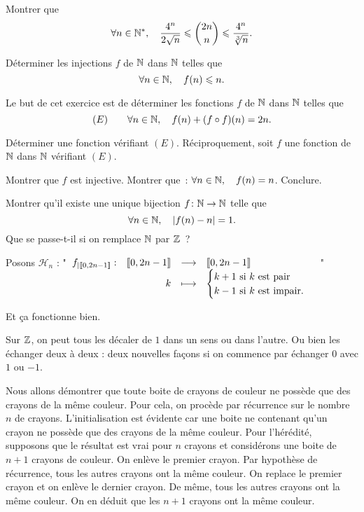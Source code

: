 \documentclass{magnolia}
\begin{document}
Montrer que
\[\forall n\in{\mathbb{N}^*},\quad \frac{4^n}{2\sqrt{n}}\leqslant\binom{2n}{n}\leqslant\frac{4^n}{\sqrt[3]{n}}.\]


Déterminer les injections $f$ de $\mathbb{N}$ dans $\mathbb{N}$ telles que
\[\forall n\in\mathbb{N},\quad f(n)\leqslant n.\]

Le but de cet exercice est de déterminer les fonctions $f$ de $\mathbb{N}$ dans $\mathbb{N}$ telles que
\[(E) \qquad \forall n\in\mathbb{N},\quad f(n)+(f\circ f)(n)=2n.\]
\begin{questions}
\question Déterminer une fonction vérifiant $(E)$.
\question Réciproquement, soit $f$ une fonction de $\mathbb{N}$ dans $\mathbb{N}$ vérifiant $(E)$.
\begin{questions}
\question Montrer que $f$ est injective.
\question Montrer que~: $\forall n\in\mathbb{N},\quad f(n)=n$. Conclure.
\end{questions}
\end{questions}


Montrer qu'il existe une unique bijection $f\colon \mathbb{N} \rightarrow \mathbb{N}$ telle que
\[\forall n\in\mathbb{N},\quad \left|f(n)-n\right|=1.\]
Que se passe-t-il si on remplace $\mathbb{N}$ par $\mathbb{Z}$~?

\begin{sol}
Posons $\mathcal{H}_n$ : "$ \begin{array}[t]{lrcl} \displaystyle{f_{|\left\llbracket 0,2n-1\right\rrbracket}} : & \displaystyle{\left\llbracket 0,2n-1\right\rrbracket} & \longrightarrow & \displaystyle{\left\llbracket 0,2n-1\right\rrbracket} \\ & \displaystyle{k} & \longmapsto & \displaystyle{\begin{cases} k+1 \text{ si } k \text{ est pair}\\ k-1 \text{ si } k \text{ est impair}.\end{cases}} \end{array}$"

Et ça fonctionne bien.

Sur $\mathbb{Z}$, on peut tous les décaler de $1$ dans un sens ou dans l'autre. Ou bien les échanger deux à deux : deux nouvelles façons si on commence par échanger $0$ avec $1$ ou $-1$.
\end{sol}

Nous allons démontrer que toute boite de crayons de couleur ne possède que des crayons de la même couleur. Pour cela, on procède par récurrence sur le nombre $n$ de crayons. L'initialisation est évidente car une boite ne contenant qu'un crayon ne possède que des crayons de la même couleur. Pour l'hérédité, supposons que le résultat est vrai pour $n$ crayons et considérons une boite de $n+1$ crayons de couleur. On enlève le premier crayon. Par hypothèse de récurrence, tous les autres crayons ont la même couleur. On replace le premier crayon et on enlève le dernier crayon. De même, tous les autres crayons ont la même couleur. On en déduit que les $n+1$ crayons ont la même couleur.\\
\end{document}
